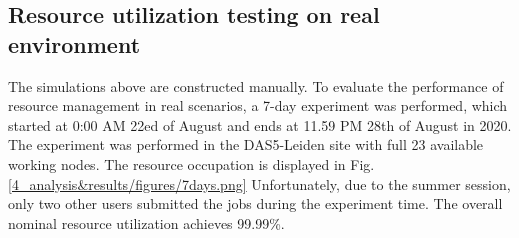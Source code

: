 \subsection{Resource utilization testing on real environment}
The simulations above are constructed manually.
To evaluate the performance of resource management in real scenarios, a 7-day experiment was performed, which started at 0:00 AM 22ed of August and ends at 11.59 PM 28th of August in 2020.
The experiment was performed in the DAS5-Leiden site with full 23 available working nodes. 
The resource occupation is displayed in Fig. \ref{4_analysis&results/figures/7days.png}  
Unfortunately, due to the summer session, only two other users submitted the jobs during the experiment time.
The overall nominal resource utilization achieves 99.99\%.
